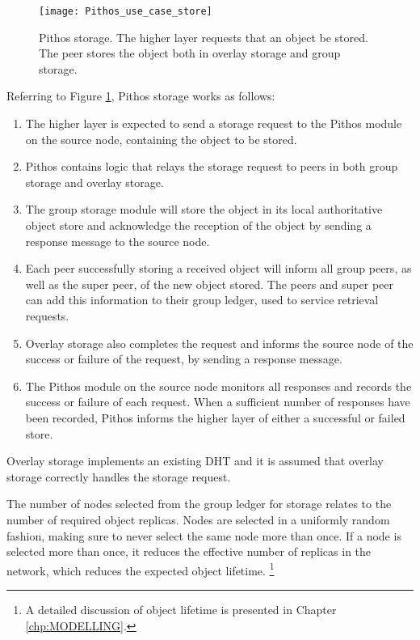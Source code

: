 \begin{figure}[htbp]
 \centering
 \texttt{[image: Pithos\_use\_case\_store]}
 \caption{Pithos storage. The higher layer requests that an object be stored. The peer stores the object both in overlay storage and group storage.}
 \label{fig_pithos_storage}
\end{figure}
%
Referring to Figure \ref{fig_pithos_storage}, Pithos storage works as follows:
%
\begin{enumerate}
\item The higher layer is expected to send a storage request to the Pithos module on the source node, containing the object to be stored.

\item Pithos contains logic that relays the storage request to peers in both group storage and overlay storage.

\item The group storage module will store the object in its local authoritative object store and acknowledge the reception of the object by sending a response message to the source node.

\item Each peer successfully storing a received object will inform all group peers, as well as the super peer, of the new object stored. The peers and super peer can add this information to their group ledger, used to service retrieval requests.

\item Overlay storage also completes the request and informs the source node of the success or failure of the request, by sending a response message.

\item The Pithos module on the source node monitors all responses and records the success or failure of each request. When a sufficient number of responses have been recorded, Pithos informs the higher layer of either a successful or failed store.
\end{enumerate}

Overlay storage implements an existing DHT and it is assumed that overlay storage correctly handles the storage request.

The number of nodes selected from the group ledger for storage relates to the number of required object replicas. Nodes are selected in a uniformly random fashion, making sure to never select the same node more than once. If a node is selected more than once, it reduces the effective number of replicas in the network, which reduces the expected object lifetime. \footnote{A detailed discussion of object lifetime is presented in Chapter \ref{chp:MODELLING}.}

